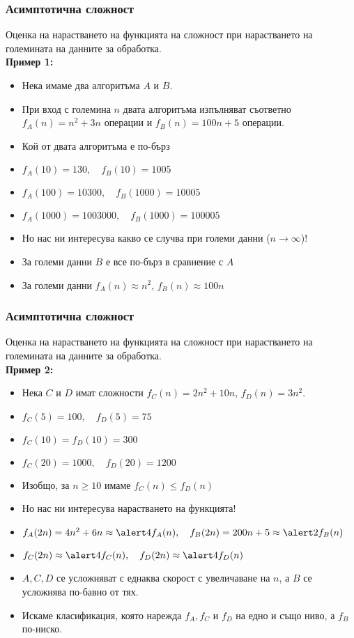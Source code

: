 \documentclass{beamer}
\begin{document}
\begin{frame}
  \frametitle{Асимптотична сложност}

  Оценка на нарастването на функцията на сложност при \alert<8>{нарастването} на големината на данните за обработка.\\
  \pause
  \textbf{Пример 1:}
  \begin{itemize}[<+->]
  \item Нека имаме два алгоритъма $A$ и $B$.
  \item При вход с големина $n$ двата алгоритъма изпълняват съответно $f_A(n) = n^2 + 3n$ операции и
    $f_B(n) = 100n + 5$ операции.
  \item<+-|alert@+-> Кой от двата алгоритъма е по-бърз
  \item $f_A(10) = 130,\quad f_B(10) = 1005$
  \item $f_A(100) = 10300,\quad f_B(1000) = 10005$
  \item $f_A(1000) = 1003000,\quad f_B(1000) = 100005$
  \item Но нас ни интересува какво се случва при \alert{големи данни ($n \to \infty$)}!
  \item За големи данни $B$ е все по-бърз в сравнение с $A$
  \item За големи данни $f_A(n) \approx n^2$, $f_B(n) \approx 100n$
  \end{itemize}
\end{frame}

\begin{frame}
  \frametitle{Асимптотична сложност}

  Оценка на \alert<6>{нарастването} на функцията на сложност при нарастването на големината на данните за обработка.\\
  \textbf{Пример 2:}
  \begin{itemize}[<+->]
  \item Нека $C$ и $D$ имат сложности $f_C(n) = 2n^2 + 10n$, $f_D(n) = 3n^2$.
  \item $f_C(5) = 100,\quad f_D(5)= 75$
  \item $f_C(10) = f_D(10) = 300$
  \item $f_C(20) = 1000,\quad f_D(20) = 1200$
  \item Изобщо, за $n \geq 10$ имаме $f_C(n) \leq f_D(n)$
  \item Но нас ни интересува \alert{нарастването} на функцията!
  \item $f_A(2n) = 4n^2 + 6n \approx \alert4f_A(n), \quad f_B(2n) = 200n + 5 \approx \alert2f_B(n)$
  \item $f_C(2n) \approx \alert4f_C(n),\quad f_D(2n) \approx \alert4f_D(n)$
  \item $A, C, D$ се усложняват с еднаква скорост с увеличаване на $n$, а $B$ се усложнява по-бавно от тях.
  \item Искаме класификация, която нарежда $f_A, f_C$ и $f_D$ на едно и също ниво, а $f_B$ по-ниско.
  \end{itemize}
\end{frame}
\end{document}

